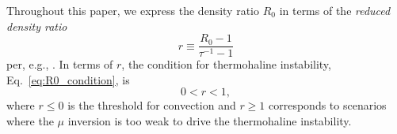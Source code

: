 Throughout this paper, we express the density ratio $R_0$ in terms of the \textit{reduced density ratio}
\begin{equation} \label{eq:r}
    r \equiv \frac{R_0 - 1}{\tau^{-1} - 1}
\end{equation}
per, e.g., \citet{traxler_etal_2011,brown_etal_2013}.
In terms of $r$, the condition for thermohaline instability, Eq.~\eqref{eq:R0_condition}, is
\begin{equation} \label{eq:r_condition}
    0 < r < 1,
\end{equation}
where $r \leq 0$ is the threshold for convection and $r \geq 1$ corresponds to scenarios where the $\mu$ inversion is too weak to drive the thermohaline instability.